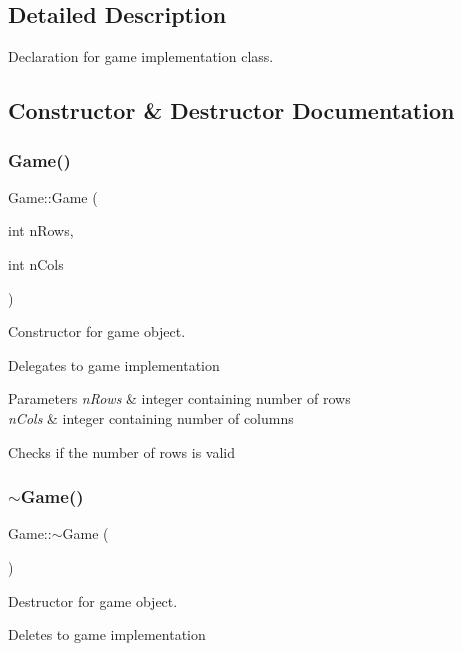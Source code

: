 \subsection{Detailed Description}
Declaration for game implementation class. 

\subsection{Constructor \& Destructor Documentation}
\mbox{\label{class_game_a848102f31ba288bac7aa39db4378db7a}} 
\subsubsection{\texorpdfstring{Game()}{Game()}\hspace{0.1cm}{\footnotesize\ttfamily [1/2]}}
{\footnotesize\ttfamily Game\+::\+Game (\begin{DoxyParamCaption}\item[{int}]{n\+Rows,  }\item[{int}]{n\+Cols }\end{DoxyParamCaption})}



Constructor for game object. 

Delegates to game implementation 
\begin{DoxyParams}{Parameters}
{\em n\+Rows} & integer containing number of rows \\
\hline
{\em n\+Cols} & integer containing number of columns \\
\hline
\end{DoxyParams}
Checks if the number of rows is valid \mbox{\label{class_game_ae3d112ca6e0e55150d2fdbc704474530}} 
\subsubsection{\texorpdfstring{$\sim$\+Game()}{~Game()}}
{\footnotesize\ttfamily Game\+::$\sim$\+Game (\begin{DoxyParamCaption}{ }\end{DoxyParamCaption})}



Destructor for game object. 

Deletes to game implementation \mbox{\label{class_game_abb28875d74d25fa9e0dcdbe37c6ad89c}} 
